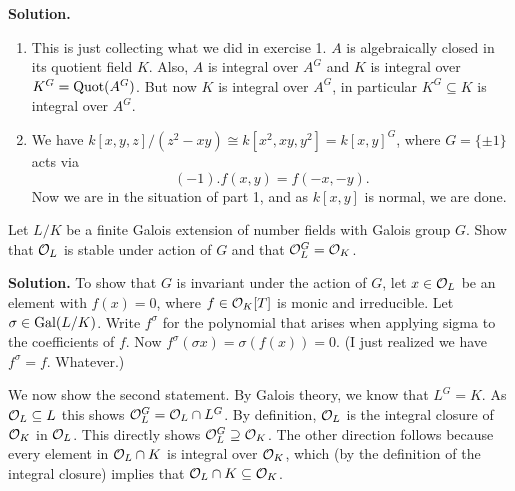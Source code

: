 \documentclass[a4paper,11pt]{article}
\begin{document}
\textbf{Solution.}
\begin{enumerate}
    \item This is just collecting what we did in exercise 1. $A$ is algebraically
        closed in its quotient field $K$. Also, $A$ is integral over $A^G$ and
        $K$ is integral over $K^G = \mathrm{Quot}(A^G)$. But now $K$ is integral over
        $A^G$, in particular $K^G \subseteq K$ is integral over $A^G$. 

    \item We have $k[x,y,z]/(z^2-xy) \cong k[x^2, xy, y^2] = k[x,y]^G$,
        where $G = \{\pm 1\}$ acts via 
        $$(-1).f(x,y) = f(-x,-y).$$
        Now we are in the situation of part 1, and as $k[x,y]$ is normal, we are 
        done.
\end{enumerate}

Let $L/K$ be a finite Galois extension of number fields with Galois group $G$. 
Show that $\mathcal{O}_L$ is stable under action of $G$ and that $\mathcal{O}_L^G = \mathcal{O}_K$. 

\textbf{Solution.} To show that $G$ is invariant under the action of $G$, let
$x \in \mathcal{O}_L$ be an element with $f(x) = 0$, where $f \in \mathcal{O}_K[T]$ is 
monic and irreducible. Let $\sigma \in \operatorname{Gal}(L/K)$. Write $f^\sigma$ for the 
polynomial that arises when applying sigma to the coefficients of 
$f$. Now $f^\sigma (\sigma x) = \sigma(f(x)) = 0.$ (I just realized we have
$f^\sigma = f$. Whatever.)

We now show the second statement. By Galois theory, we know that 
$L^G = K$. As $\mathcal{O}_L \subseteq L$ this shows 
$\mathcal{O}_L^G = \mathcal{O}_L \cap L^G$. By definition, $\mathcal{O}_L$ is the integral closure of
$\mathcal{O}_K$ in $\mathcal{O}_L$. This directly shows $\mathcal{O}_L^G \supseteq \mathcal{O}_K$. The other 
direction follows because every element in $\mathcal{O}_L \cap K$ is integral over 
$\mathcal{O}_K$, which (by the definition of the integral closure) implies that
$\mathcal{O}_L \cap K \subseteq \mathcal{O}_K$. 
\end{document}
